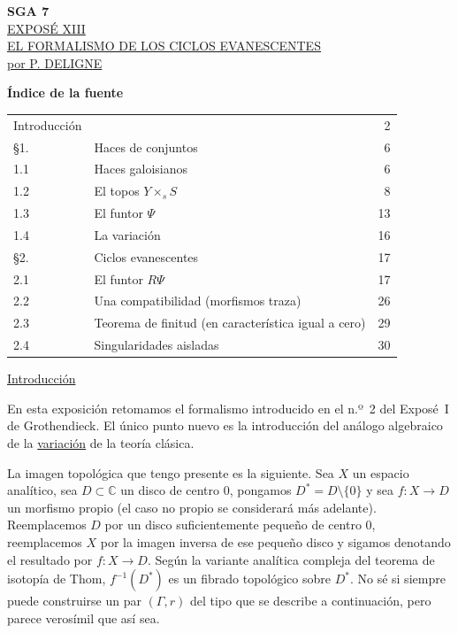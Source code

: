 
\clearpage
\pageoriginale

\begin{center}
{\large\textbf{SGA 7}}\\[1.5em]
{\Large\underline{EXPOSÉ XIII}}\\[2.5em]
{\Large\underline{\underline{EL FORMALISMO DE LOS CICLOS EVANESCENTES}}}\\[1.5em]
{\large\underline{por P. DELIGNE}}
\end{center}

\bigskip
\noindent\textbf{Índice de la fuente}
\begin{center}
\begin{tabular}{@{}llr@{}}
Introducción && 2\\
\S1. & Haces de conjuntos & 6\\
1.1 & Haces galoisianos & 6\\
1.2 & El topos $Y\times_s S$ & 8\\
1.3 & El funtor $\Psi$ & 13\\
1.4 & La variación & 16\\
\S2. & Ciclos evanescentes & 17\\
2.1 & El funtor $R\Psi$ & 17\\
2.2 & Una compatibilidad (morfismos traza) & 26\\
2.3 & Teorema de finitud (en característica igual a cero) & 29\\
2.4 & Singularidades aisladas & 30
\end{tabular}
\end{center}

\pageoriginale

\bigskip
\noindent\underline{Introducción}

En esta exposición retomamos el formalismo introducido en el n.º~2 del Exposé~I
de Grothendieck. El único punto nuevo es la introducción del análogo
algebraico de la \underline{variación} de la teoría clásica.

La imagen topológica que tengo presente es la siguiente. Sea $X$ un espacio
analítico, sea $D\subset\mathbb C$ un disco de centro $0$, pongamos
$D^*=D\setminus\{0\}$ y sea $f:X\longrightarrow D$ un morfismo propio (el
caso no propio se considerará más adelante). Reemplacemos $D$ por un disco
suficientemente pequeño de centro $0$, reemplacemos $X$ por la imagen inversa
de ese pequeño disco y sigamos denotando el resultado por
$f:X\longrightarrow D$. Según la variante analítica compleja del teorema de
isotopía de Thom, $f^{-1}(D^*)$ es un fibrado topológico sobre $D^*$. No sé
si siempre puede construirse un par $(\Gamma,r)$ del tipo que se describe a
continuación, pero parece verosímil que así sea.

